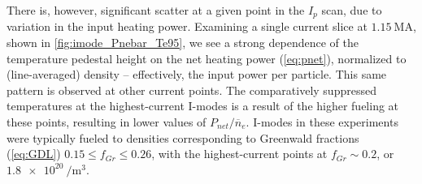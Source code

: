 \begin{figure}
 \pushtooutside
\end{figure}

There is, however, significant scatter at a given point in the $I_p$ scan, due to variation in the input heating power.  Examining a single current slice at $\SI{1.15}{\mega\ampere}$, shown in \cref{fig:imode_Pnebar_Te95}, we see a strong dependence of the temperature pedestal height on the net heating power (\cref{eq:pnet}), normalized to (line-averaged) density -- effectively, the input power per particle.  This same pattern is observed at other current points.  The comparatively suppressed temperatures at the highest-current I-modes is a result of the higher fueling at these points, resulting in lower values of $P_{net}/\overline{n}_e$.  I-modes in these experiments were typically fueled to densities corresponding to Greenwald fractions  (\cref{eq:GDL}) $0.15 \le f_{Gr} \le 0.26$, with the highest-current points at $f_{Gr} \sim 0.2$, or $\SI{1.8e20}{\per\meter\cubed}$.

